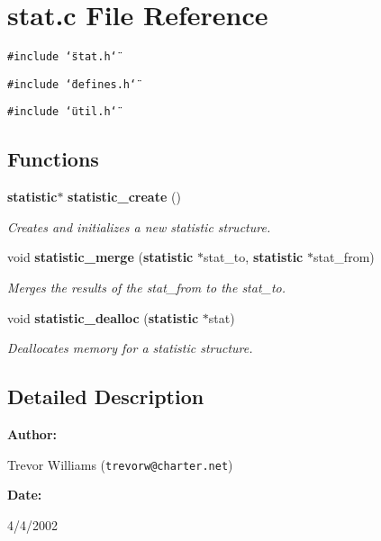 \section{stat.c File Reference}
\label{stat_8c}
{\tt \#include \char`\"{}stat.h\char`\"{}}\par
{\tt \#include \char`\"{}defines.h\char`\"{}}\par
{\tt \#include \char`\"{}util.h\char`\"{}}\par
\subsection*{Functions}
\begin{CompactItemize}
\item 
{\bf statistic}$\ast$ {\bf statistic\_\-create} ()
\begin{CompactList}\small\item\em Creates and initializes a new statistic structure.\item\end{CompactList}\item 
void {\bf statistic\_\-merge} ({\bf statistic} $\ast$stat\_\-to, {\bf statistic} $\ast$stat\_\-from)
\begin{CompactList}\small\item\em Merges the results of the stat\_\-from to the stat\_\-to.\item\end{CompactList}\item 
void {\bf statistic\_\-dealloc} ({\bf statistic} $\ast$stat)
\begin{CompactList}\small\item\em Deallocates memory for a statistic structure.\item\end{CompactList}\end{CompactItemize}


\subsection{Detailed Description}


\begin{Desc}
\item[{\bf Author: }]\par
Trevor Williams ({\tt trevorw@charter.net}) \end{Desc}
\begin{Desc}
\item[{\bf Date: }]\par
4/4/2002

\end{Desc}


